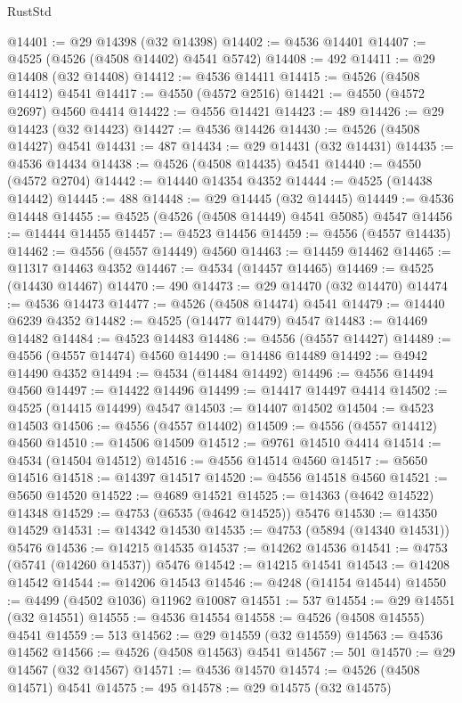 \begin{lexlean}{RustStd}
\begin{coremodule}
@14401 := @29 @14398 (@32 @14398)
@14402 := @4536 @14401
@14407 := @4525 (@4526 (@4508 @14402) @4541 @5742)
@14408 := 492
@14411 := @29 @14408 (@32 @14408)
@14412 := @4536 @14411
@14415 := @4526 (@4508 @14412) @4541
@14417 := @4550 (@4572 @2516)
@14421 := @4550 (@4572 @2697) @4560 @4414
@14422 := @4556 @14421
@14423 := 489
@14426 := @29 @14423 (@32 @14423)
@14427 := @4536 @14426
@14430 := @4526 (@4508 @14427) @4541
@14431 := 487
@14434 := @29 @14431 (@32 @14431)
@14435 := @4536 @14434
@14438 := @4526 (@4508 @14435) @4541
@14440 := @4550 (@4572 @2704)
@14442 := @14440 @14354 @4352
@14444 := @4525 (@14438 @14442)
@14445 := 488
@14448 := @29 @14445 (@32 @14445)
@14449 := @4536 @14448
@14455 := @4525 (@4526 (@4508 @14449) @4541 @5085) @4547
@14456 := @14444 @14455
@14457 := @4523 @14456
@14459 := @4556 (@4557 @14435)
@14462 := @4556 (@4557 @14449) @4560
@14463 := @14459 @14462
@14465 := @11317 @14463 @4352
@14467 := @4534 (@14457 @14465)
@14469 := @4525 (@14430 @14467)
@14470 := 490
@14473 := @29 @14470 (@32 @14470)
@14474 := @4536 @14473
@14477 := @4526 (@4508 @14474) @4541
@14479 := @14440 @6239 @4352
@14482 := @4525 (@14477 @14479) @4547
@14483 := @14469 @14482
@14484 := @4523 @14483
@14486 := @4556 (@4557 @14427)
@14489 := @4556 (@4557 @14474) @4560
@14490 := @14486 @14489
@14492 := @4942 @14490 @4352
@14494 := @4534 (@14484 @14492)
@14496 := @4556 @14494 @4560
@14497 := @14422 @14496
@14499 := @14417 @14497 @4414
@14502 := @4525 (@14415 @14499) @4547
@14503 := @14407 @14502
@14504 := @4523 @14503
@14506 := @4556 (@4557 @14402)
@14509 := @4556 (@4557 @14412) @4560
@14510 := @14506 @14509
@14512 := @9761 @14510 @4414
@14514 := @4534 (@14504 @14512)
@14516 := @4556 @14514 @4560
@14517 := @5650 @14516
@14518 := @14397 @14517
@14520 := @4556 @14518 @4560
@14521 := @5650 @14520
@14522 := @4689 @14521
@14525 := @14363 (@4642 @14522) @14348
@14529 := @4753 (@6535 (@4642 @14525)) @5476
@14530 := @14350 @14529
@14531 := @14342 @14530
@14535 := @4753 (@5894 (@14340 @14531)) @5476
@14536 := @14215 @14535
@14537 := @14262 @14536
@14541 := @4753 (@5741 (@14260 @14537)) @5476
@14542 := @14215 @14541
@14543 := @14208 @14542
@14544 := @14206 @14543
@14546 := @4248 (@14154 @14544)
@14550 := @4499 (@4502 @1036) @11962 @10087
@14551 := 537
@14554 := @29 @14551 (@32 @14551)
@14555 := @4536 @14554
@14558 := @4526 (@4508 @14555) @4541
@14559 := 513
@14562 := @29 @14559 (@32 @14559)
@14563 := @4536 @14562
@14566 := @4526 (@4508 @14563) @4541
@14567 := 501
@14570 := @29 @14567 (@32 @14567)
@14571 := @4536 @14570
@14574 := @4526 (@4508 @14571) @4541
@14575 := 495
@14578 := @29 @14575 (@32 @14575)

\end{coremodule}
\end{lexlean}
